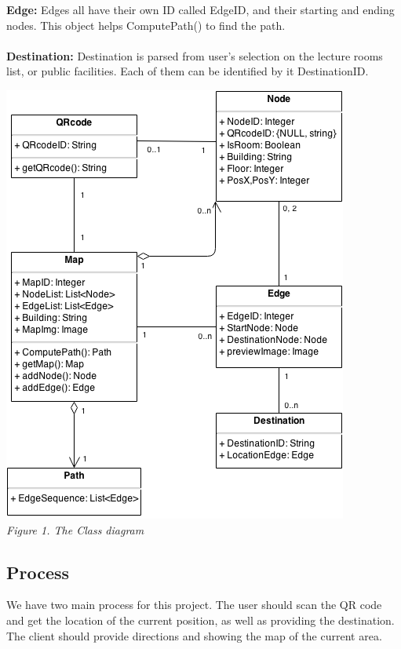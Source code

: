\documentclass[12pt]{article}
\begin{document}
\textbf{Edge:}
Edges all have their own ID called EdgeID, and their starting and ending nodes. This object helps ComputePath() to find the path.
\\ \\
\textbf{Destination:}
Destination is parsed from user’s selection on the lecture rooms list, or public facilities. Each of them can be identified by it DestinationID. 
\begin{center}
\includegraphics[scale=0.6]{image/image01.png}
\\
\textit{Figure 1. The Class diagram}
\end{center}
\subsection{Process}
We have two main process for this project. The user should scan the QR code and get the location of the current position, as well as providing the destination. The client should provide directions and showing the map of the current area.
\end{document}
